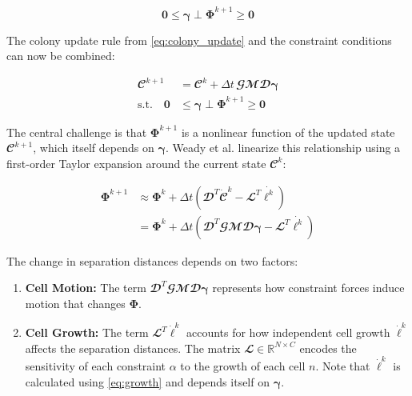 \documentclass[conference]{IEEEtran}
\begin{document}
\begin{equation}
    \mathbf{0} \leq \boldsymbol{\gamma} \perp \mathbf{\Phi}^{k+1} \geq \mathbf{0}
\end{equation}


The colony update rule from \autoref{eq:colony_update} and the constraint conditions can now be combined:

\begin{align}
    \mathbfcal{C}^{k+1}          & = \mathbfcal{C}^k + \Delta t \, \mathbfcal{G} \mathbfcal{M} \mathbfcal{D} \boldsymbol{\gamma} \label{eq:hard_update_constraint} \\
    \text{s.t.} \quad \mathbf{0} & \leq \boldsymbol{\gamma} \perp \mathbf{\Phi}^{k+1} \geq \mathbf{0} \label{eq:hard_constraints}
\end{align}

The central challenge is that $\mathbf{\Phi}^{k+1}$ is a nonlinear function of the updated state $\mathbfcal{C}^{k+1}$, which itself depends on $\boldsymbol{\gamma}$. Weady et al.\cite{Weady2024} linearize this relationship using a first-order Taylor expansion around the current state $\mathbfcal{C}^k$:

\begin{align}
    \mathbf{\Phi}^{k+1} & \approx \mathbf{\Phi}^k + \Delta t \left( \mathbfcal{D}^T \dot{\mathbfcal{C}}^k - \mathbfcal{L}^T\dot{\boldsymbol{\ell}^k} \right)                                                            \\
                        & = \mathbf{\Phi}^k + \Delta t \left( \mathbfcal{D}^T \mathbfcal{G} \mathbfcal{M} \mathbfcal{D} \boldsymbol{\gamma} - \mathbfcal{L}^T \dot{\boldsymbol{\ell}^k} \right) \label{eq:phi_expanded}
\end{align}

The change in separation distances depends on two factors:

\begin{enumerate}
    \item \textbf{Cell Motion:} The term $\mathbfcal{D}^T \mathbfcal{G} \mathbfcal{M} \mathbfcal{D} \boldsymbol{\gamma}$ represents how constraint forces induce motion that changes $\mathbf{\Phi}$.
    \item \textbf{Cell Growth:} The term $\mathbfcal{L}^T \dot{\boldsymbol{\ell}}^k$ accounts for how independent cell growth $\dot{\boldsymbol{\ell}}^k$ affects the separation distances. The matrix $\mathbfcal{L} \in \mathbb{R}^{N \times C}$ encodes the sensitivity of each constraint $\alpha$ to the growth of each cell $n$.  Note that $\dot{\boldsymbol{\ell}}^k$ is calculated using \autoref{eq:growth} and depends itself on $\boldsymbol{\gamma}$.
\end{enumerate}
\end{document}
